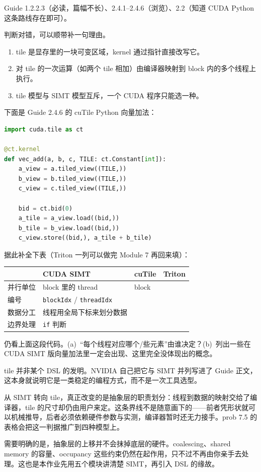 \documentclass[11pt,a4paper,fontset=none]{ctexart}
\begin{document}
\begin{reading}
Guide 1.2.2.3（必读，篇幅不长）、2.4.1--2.4.6（浏览）、2.2（知道 CUDA Python 这条路线存在即可）。
\end{reading}

判断对错，可以顺带补一句理由。
\begin{enumerate}[label=(\alph*)]
  \item tile 是显存里的一块可变区域，kernel 通过指针直接改写它。
  \item 对 tile 的一次运算（如两个 tile 相加）由编译器映射到 block 内的多个线程上执行。
  \item tile 模型与 SIMT 模型互斥，一个 CUDA 程序只能选一种。
\end{enumerate}

下面是 Guide 2.4.6 的 cuTile Python 向量加法：

\begin{lstlisting}[language=Python]
import cuda.tile as ct

@ct.kernel
def vec_add(a, b, c, TILE: ct.Constant[int]):
    a_view = a.tiled_view((TILE,))
    b_view = b.tiled_view((TILE,))
    c_view = c.tiled_view((TILE,))

    bid = ct.bid(0)
    a_tile = a_view.load((bid,))
    b_tile = b_view.load((bid,))
    c_view.store((bid,), a_tile + b_tile)
\end{lstlisting}

据此补全下表（Triton 一列可以做完 Module 7 再回来填）：

\begin{center}\small
\begin{tabular}{@{}lp{8em}p{9em}p{9em}@{}}
\toprule
 & CUDA SIMT & cuTile & Triton \\
\midrule
并行单位 & block 里的 thread & block & \\
编号 & \texttt{blockIdx} / \texttt{threadIdx} &  & \\
数据分工 & 线程用全局下标来划分数据 &  & \\
边界处理 & \texttt{if} 判断 &  & \\
\bottomrule
\end{tabular}
\end{center}

仍看上面这段代码。(a)~“每个线程对应哪个/些元素”由谁决定？(b)~列出一些在 CUDA SIMT 版向量加法里一定会出现、这里完全没体现出的概念。

\begin{lookback}
tile 并非某个 DSL 的发明。NVIDIA 自己把它与 SIMT 并列写进了 Guide 正文，这本身就说明它是一类稳定的编程方式，而不是一次工具选型。

从 SIMT 转向 tile，真正改变的是抽象层的职责划分：线程到数据的映射交给了编译器，tile 的尺寸却仍由用户来定。这条界线不是随意画下的——前者凭形状就可以机械推导，后者必须依赖硬件参数与实测，编译器暂时还无力接手。prob 7.5 的表格会把这一判据推广到四种模型上。

需要明确的是，抽象层的上移并不会抹掉底层的硬件。coalescing、shared memory 的容量、occupancy 这些约束仍然在起作用，只不过不再由你亲手去处理。这也是本作业先用五个模块讲清楚 SIMT，再引入 DSL 的缘故。
\end{lookback}
\end{document}
